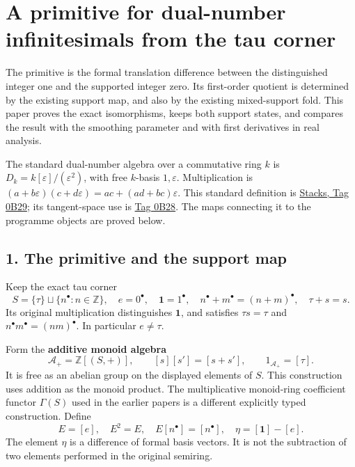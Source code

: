 \documentclass[
]{article}
\begin{document}
\section{A primitive for dual-number infinitesimals from the tau
corner}\label{a-primitive-for-dual-number-infinitesimals-from-the-tau-corner}

The primitive is the formal translation difference between the
distinguished integer one and the supported integer zero. Its
first-order quotient is determined by the existing support map, and also
by the existing mixed-support fold. This paper proves the exact
isomorphisms, keeps both support states, and compares the result with
the smoothing parameter and with first derivatives in real analysis.

The standard dual-number algebra over a commutative ring \(k\) is
\(D_k=k[\varepsilon]/(\varepsilon^2)\), with free \(k\)-basis
\(1,\varepsilon\). Multiplication is
\((a+b\varepsilon)(c+d\varepsilon)=ac+(ad+bc)\varepsilon\). This
standard definition is
\href{https://stacks.math.columbia.edu/tag/0B29}{Stacks, Tag 0B29}; its
tangent-space use is
\href{https://stacks.math.columbia.edu/tag/0B28}{Tag 0B28}. The maps
connecting it to the programme objects are proved below.

\subsection{1. The primitive and the support
map}\label{the-primitive-and-the-support-map}

Keep the exact tau corner \[
S=\{\tau\}\sqcup\{n^\bullet:n\in\mathbb Z\},\quad
e=0^\bullet,\quad \mathbf1=1^\bullet,
\quad n^\bullet+m^\bullet=(n+m)^\bullet,
\quad\tau+s=s.
\tag{DN1}
\] Its original multiplication distinguishes \(\mathbf1\), and satisfies
\(\tau s=\tau\) and \(n^\bullet m^\bullet=(nm)^\bullet\). In particular
\(e\ne\tau\).

Form the \textbf{additive monoid algebra} \[
\mathcal A_+=\mathbb Z[(S,+)],\qquad
[s][s']=[s+s'],\qquad 1_{\mathcal A_+}=[\tau].
\tag{DN2}
\] It is free as an abelian group on the displayed elements of \(S\).
This construction uses addition as the monoid product. The
multiplicative monoid-ring coefficient functor \(\Gamma(S)\) used in the
earlier papers is a different explicitly typed construction. Define \[
E=[e],\quad E^2=E,\quad E[n^\bullet]=[n^\bullet],
\quad\eta=[\mathbf1]-[e].
\tag{DN3}
\] The element \(\eta\) is a difference of formal basis vectors. It is
not the subtraction of two elements performed in the original semiring.
\end{document}
